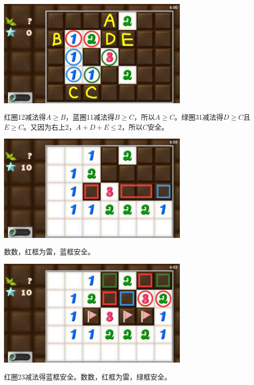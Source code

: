 \subsection{} %
\begin{center}
    \includegraphics[width=0.7\textwidth]{puzzlelow/101-1.jpg}
\end{center}
红圈12减法得$A\ge B$，蓝圈11减法得$B\ge C$，所以$A\ge C$。绿圈31减法得$D\ge C$且$E\ge C$。又因为右上2，$A+D+E\le 2$，所以$C$安全。
\begin{center}
    \includegraphics[width=0.7\textwidth]{puzzlelow/101-2.jpg}
\end{center}
数数，红框为雷，蓝框安全。
\begin{center}
    \includegraphics[width=0.7\textwidth]{puzzlelow/101-3.jpg}
\end{center}
红圈23减法得蓝框安全。数数，红框为雷，绿框安全。

